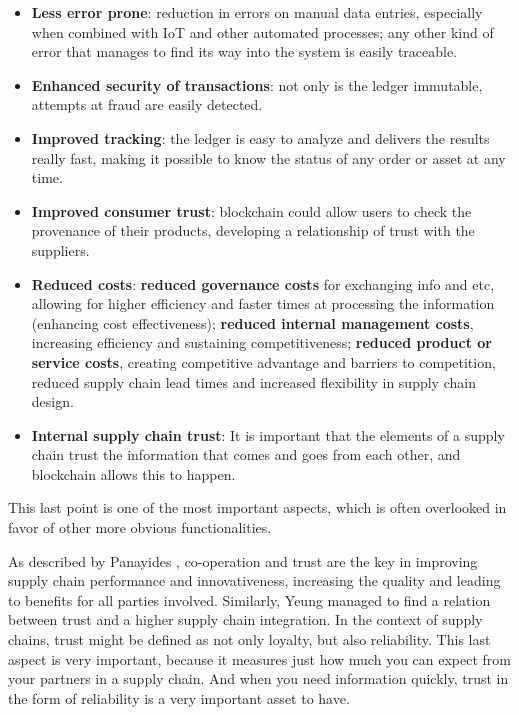 \begin{itemize}
\item \textbf{Less error prone}: reduction in errors on manual data entries, especially when combined with IoT and other automated processes; any other kind of error that manages to find its way into the system is easily traceable. 
\item \textbf{Enhanced security of transactions}: not only is the ledger immutable, attempts at fraud are easily detected.
\item \textbf{Improved tracking}: the ledger is easy to analyze and delivers the results really fast, making it possible to know the status of any order or asset at any time.
\item \textbf{Improved consumer trust}: blockchain could allow users to check the provenance of their products, developing a relationship of trust with the suppliers.
\item \textbf{Reduced costs}: \textbf{reduced governance costs} for exchanging info and etc, allowing for higher efficiency and faster times at processing the information (enhancing cost effectiveness); \textbf{reduced internal management costs}, increasing efficiency and sustaining competitiveness; \textbf{reduced product or service costs}, creating competitive advantage and barriers to competition, reduced supply chain lead times and increased flexibility in supply chain design. %
\item \textbf{Internal supply chain trust}: It is important that the elements of a supply chain trust the information that comes and goes from each other, and blockchain allows this to happen.

\end{itemize}


This last point is one of the most important aspects, which is often overlooked in favor of other more obvious functionalities.

As described by Panayides \cite{Panayides2009}, co-operation and trust are the key in improving supply chain performance and innovativeness, increasing the quality and leading to benefits for all parties involved. Similarly, Yeung \cite{Yeung2009} managed to find a relation between trust and a higher supply chain integration. In the context of supply chains, trust might be defined as not only loyalty, but also reliability. This last aspect is very important, because it measures just how much you can expect from your partners in a supply chain. And when you need information quickly, trust in the form of reliability is a very important asset to have.

